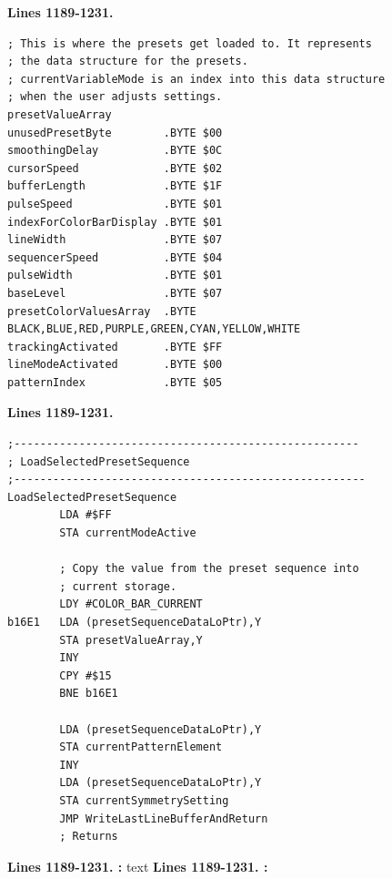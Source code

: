 \clearpage
\textbf{Lines 1189-1231. } 
\begin{lstlisting}
; This is where the presets get loaded to. It represents
; the data structure for the presets.
; currentVariableMode is an index into this data structure
; when the user adjusts settings.
presetValueArray
unusedPresetByte        .BYTE $00
smoothingDelay          .BYTE $0C
cursorSpeed             .BYTE $02
bufferLength            .BYTE $1F
pulseSpeed              .BYTE $01
indexForColorBarDisplay .BYTE $01
lineWidth               .BYTE $07
sequencerSpeed          .BYTE $04
pulseWidth              .BYTE $01
baseLevel               .BYTE $07
presetColorValuesArray  .BYTE BLACK,BLUE,RED,PURPLE,GREEN,CYAN,YELLOW,WHITE
trackingActivated       .BYTE $FF
lineModeActivated       .BYTE $00
patternIndex            .BYTE $05
\end{lstlisting}
\textbf{Lines 1189-1231. } 
\begin{lstlisting}
;-----------------------------------------------------
; LoadSelectedPresetSequence
;------------------------------------------------------
LoadSelectedPresetSequence    
        LDA #$FF
        STA currentModeActive

        ; Copy the value from the preset sequence into 
        ; current storage.
        LDY #COLOR_BAR_CURRENT
b16E1   LDA (presetSequenceDataLoPtr),Y
        STA presetValueArray,Y
        INY 
        CPY #$15
        BNE b16E1

        LDA (presetSequenceDataLoPtr),Y
        STA currentPatternElement
        INY 
        LDA (presetSequenceDataLoPtr),Y
        STA currentSymmetrySetting
        JMP WriteLastLineBufferAndReturn
        ; Returns
\end{lstlisting}
\clearpage

\textbf{Lines 1189-1231. :} 
text
\textbf{Lines 1189-1231. :} 
\clearpage


